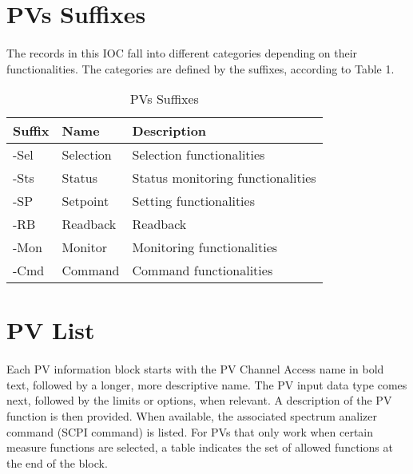 \documentclass[openany]{article}
\begin{document}
\section{PVs Suffixes}

	\paragraph{} The records in this IOC fall into different categories depending on their functionalities. The categories are defined by the suffixes, according to Table 1.

	\begin{table}[!h]
		\center
		\caption{PVs Suffixes}
		\begin{tabular}{m{3cm} m{3cm} m{7cm}}
			\hline
			\bfseries Suffix & \bfseries Name & \bfseries Description \\ \hline
			-Sel & Selection & Selection functionalities \\ \hline
			-Sts & Status & Status monitoring functionalities \\ \hline
			-SP & Setpoint & Setting functionalities \\ \hline
			-RB & Readback & Readback \\ \hline
			-Mon & Monitor & Monitoring functionalities \\ \hline
			-Cmd & Command & Command functionalities\\ \hline

		\end{tabular}
	\end{table}

\section{PV List}

		\paragraph{} Each PV information block starts with the PV Channel Access name in bold text, followed by a longer, more descriptive name. The PV input data type comes next, followed by the limits or options, when relevant. A description of the PV function is then provided. When available, the associated spectrum analizer command (SCPI command) is listed. For PVs that only work when certain measure functions are selected, a table indicates the set of allowed functions at the end of the block.
\end{document}
